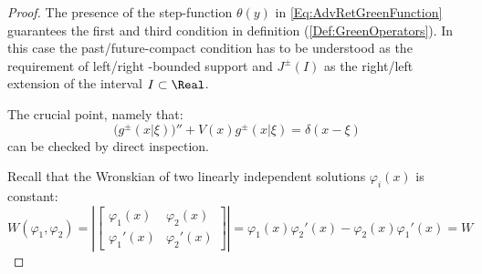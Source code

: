 \documentclass[Main]{subfiles}
\begin{document}
	\begin{proof}
		The presence of the step-function $\theta(y)$ in \ref{Eq:AdvRetGreenFunction} guarantees the first and third condition in definition (\ref{Def:GreenOperators}). In this case the past/future-compact condition has to be understood as the requirement of left/right -bounded support  and $J^\pm(I)$ as the right/left extension of the interval $I \subset \Real$.
		
		The crucial point, namely that:
		\begin{displaymath}
			\big( g^\pm ( x \vert \xi) \big)'' + V(x) g^\pm ( x \vert \xi) = \delta(x - \xi)
		\end{displaymath}
		can be checked by direct inspection.
		
		Recall that the Wronskian of two linearly independent solutions $\varphi_i(x)$ is constant:
		\begin{displaymath}
			W(\varphi_1 , \varphi_2) = \left\vert 
				\begin{bmatrix}
        			\varphi_1(x)	&	\varphi_2(x) \\
        			\varphi_1'(x)	&	\varphi_2'(x)
     			\end{bmatrix} 
     		\right\vert = \varphi_1(x)\varphi_2'(x)  - \varphi_2(x)\varphi_1'(x) = W
		\end{displaymath}
		

\end{proof}
\end{document}
